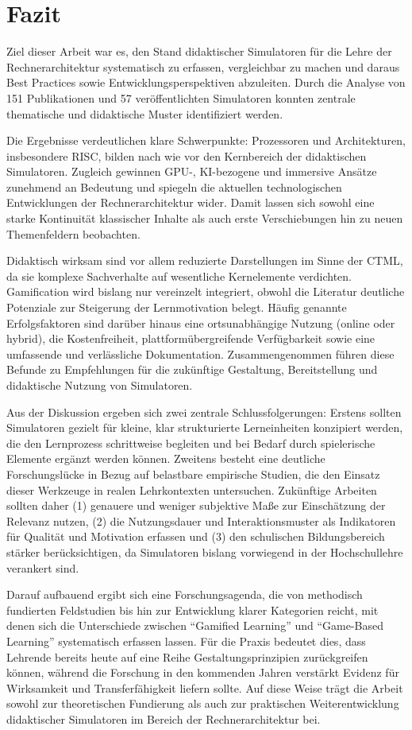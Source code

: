 \chapter{Fazit}

Ziel dieser Arbeit war es, den Stand didaktischer Simulatoren für die Lehre der Rechnerarchitektur systematisch zu erfassen, vergleichbar zu machen und daraus Best Practices sowie Entwicklungsperspektiven abzuleiten. Durch die Analyse von 151 Publikationen und 57 veröffentlichten Simulatoren konnten zentrale thematische und didaktische Muster identifiziert werden.

Die Ergebnisse verdeutlichen klare Schwerpunkte: Prozessoren und Architekturen, insbesondere \acs{RISC}, bilden nach wie vor den Kernbereich der didaktischen Simulatoren. Zugleich gewinnen GPU-, KI-bezogene und immersive Ansätze zunehmend an Bedeutung und spiegeln die aktuellen technologischen Entwicklungen der Rechnerarchitektur wider. Damit lassen sich sowohl eine starke Kontinuität klassischer Inhalte als auch erste Verschiebungen hin zu neuen Themenfeldern beobachten.

Didaktisch wirksam sind vor allem reduzierte Darstellungen im Sinne der \acl{CTML}, da sie komplexe Sachverhalte auf wesentliche Kernelemente verdichten. Gamification wird bislang nur vereinzelt integriert, obwohl die Literatur deutliche Potenziale zur Steigerung der Lernmotivation belegt. Häufig genannte Erfolgsfaktoren sind darüber hinaus eine ortsunabhängige Nutzung (online oder hybrid), die Kostenfreiheit, plattformübergreifende Verfügbarkeit sowie eine umfassende und verlässliche Dokumentation. Zusammengenommen führen diese Befunde zu Empfehlungen für die zukünftige Gestaltung, Bereitstellung und didaktische Nutzung von Simulatoren.

Aus der Diskussion ergeben sich zwei zentrale Schlussfolgerungen: Erstens sollten Simulatoren gezielt für kleine, klar strukturierte Lerneinheiten konzipiert werden, die den Lernprozess schrittweise begleiten und bei Bedarf durch spielerische Elemente ergänzt werden können. Zweitens besteht eine deutliche Forschungslücke in Bezug auf belastbare empirische Studien, die den Einsatz dieser Werkzeuge in realen Lehrkontexten untersuchen. Zukünftige Arbeiten sollten daher (1) genauere und weniger subjektive Maße zur Einschätzung der Relevanz nutzen, (2) die Nutzungsdauer und Interaktionsmuster als Indikatoren für Qualität und Motivation erfassen und (3) den schulischen Bildungsbereich stärker berücksichtigen, da Simulatoren bislang vorwiegend in der Hochschullehre verankert sind.

Darauf aufbauend ergibt sich eine Forschungsagenda, die von methodisch fundierten Feldstudien bis hin zur Entwicklung klarer Kategorien reicht, mit denen sich die Unterschiede zwischen \enquote{Gamified Learning} und \enquote{Game-Based Learning} systematisch erfassen lassen. Für die Praxis bedeutet dies, dass Lehrende bereits heute auf eine Reihe Gestaltungsprinzipien zurückgreifen können, während die Forschung in den kommenden Jahren verstärkt Evidenz für Wirksamkeit und Transferfähigkeit liefern sollte. Auf diese Weise trägt die Arbeit sowohl zur theoretischen Fundierung als auch zur praktischen Weiterentwicklung didaktischer Simulatoren im Bereich der Rechnerarchitektur bei.

